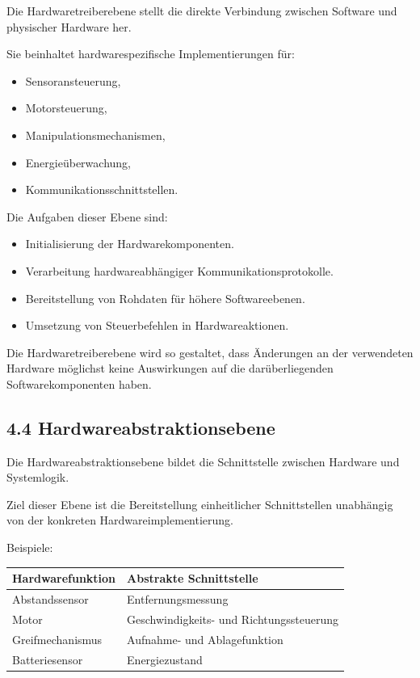 \documentclass[
  a4paper,
  12pt,
  DIV=12,        %
  parskip=half,  %
  headings=small %
]{scrartcl}
\theoremstyle{definition}
\providecommand{\tightlist}{%
  \setlength{\itemsep}{0pt}\setlength{\parskip}{0pt}}
\theoremstyle{definition}
\providecommand{\tightlist}{%
  \setlength{\itemsep}{0pt}\setlength{\parskip}{0pt}}
\begin{document}
Die Hardwaretreiberebene stellt die direkte Verbindung zwischen Software
und physischer Hardware her.

Sie beinhaltet hardwarespezifische Implementierungen für:

\begin{itemize}
\tightlist
\item
  Sensoransteuerung,
\item
  Motorsteuerung,
\item
  Manipulationsmechanismen,
\item
  Energieüberwachung,
\item
  Kommunikationsschnittstellen.
\end{itemize}

Die Aufgaben dieser Ebene sind:

\begin{itemize}
\tightlist
\item
  Initialisierung der Hardwarekomponenten.
\item
  Verarbeitung hardwareabhängiger Kommunikationsprotokolle.
\item
  Bereitstellung von Rohdaten für höhere Softwareebenen.
\item
  Umsetzung von Steuerbefehlen in Hardwareaktionen.
\end{itemize}

Die Hardwaretreiberebene wird so gestaltet, dass Änderungen an der
verwendeten Hardware möglichst keine Auswirkungen auf die
darüberliegenden Softwarekomponenten haben.

\subsection{4.4
Hardwareabstraktionsebene}\label{hardwareabstraktionsebene-1}

Die Hardwareabstraktionsebene bildet die Schnittstelle zwischen Hardware
und Systemlogik.

Ziel dieser Ebene ist die Bereitstellung einheitlicher Schnittstellen
unabhängig von der konkreten Hardwareimplementierung.

Beispiele:

\begin{longtable}[]{@{}ll@{}}
\toprule\noalign{}
Hardwarefunktion & Abstrakte Schnittstelle \\
\midrule\noalign{}
\endhead
\bottomrule\noalign{}
\endlastfoot
Abstandssensor & Entfernungsmessung \\
Motor & Geschwindigkeits- und Richtungssteuerung \\
Greifmechanismus & Aufnahme- und Ablagefunktion \\
Batteriesensor & Energiezustand \\
\end{longtable}
\end{document}
